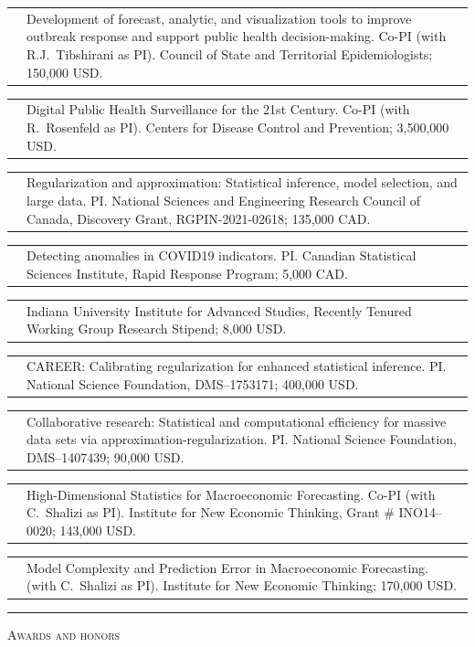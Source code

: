 \documentclass[11pt,letterpaper]{minimal/moderncv}
\makeatletter
\renewcommand{\section}[1]{  \par\addvspace{15pt}%
  \parbox[t]{\hintscolumnwidth}{\strut\raggedleft\raisebox{4pt}%
  {\rule{\hintscolumnwidth}{2pt}}}%
  \hspace{\separatorcolumnwidth}%
  \textsc{\Large #1}\par\nobreak\addvspace{6pt}%
}
\renewcommand*{\cvitem}[2]{%
  \begin{tabular}{@{}p{\hintscolumnwidth}@{\hspace{\separatorcolumnwidth}}%
    p{\maincolumnwidth}@{}}%
    \raggedleft {#1} &  {#2}%
  \end{tabular}%
}
\makeatother
\begin{document}
\cvitem{2023--2024}{Development of forecast, analytic, and visualization tools
to improve outbreak response and support public health decision-making. Co-PI
(with R.J.\ Tibshirani as PI). Council of State and Territorial Epidemiologists;
150,000 USD.}

\cvitem{2023}{Digital Public Health Surveillance for the 21st Century. Co-PI
(with R.\ Rosenfeld as PI). Centers for Disease Control and Prevention;
3,500,000 USD.}

\cvitem{2021--2027}{Regularization and approximation: Statistical inference,
  model selection, and large data. PI. National Sciences and Engineering
  Research Council of Canada, Discovery Grant, RGPIN-2021-02618; 135,000 CAD.}

\cvitem{2020--2021}{Detecting anomalies in COVID19
  indicators. PI. Canadian Statistical Sciences Institute, Rapid
  Response Program; 5,000 CAD.}

\cvitem{2019--2020}{Indiana University Institute for Advanced Studies, Recently
  Tenured Working Group Research Stipend; 8,000 USD.}

\cvitem{2018--2023}{CAREER:
  Calibrating regularization for enhanced statistical inference.
PI. National Science Foundation, DMS--1753171; 400,000 USD.}


\cvitem{2014--2018}{Collaborative
  research: Statistical and computational efficiency for 
massive data sets via approximation-regularization. PI. National
Science Foundation, DMS--1407439; 90,000 USD.}


\cvitem{2014--2016}{High-Dimensional Statistics for Macroeconomic Forecasting. Co-PI (with C.\ Shalizi as PI). Institute for New Economic Thinking, Grant \# INO14--0020; 143,000 USD.}


\cvitem{2011--2013}{
Model Complexity and Prediction Error in Macroeconomic Forecasting.
(with C.\ Shalizi as PI).
Institute for New Economic Thinking; 170,000 USD.}


  
\section{Awards and honors}
\end{document}
